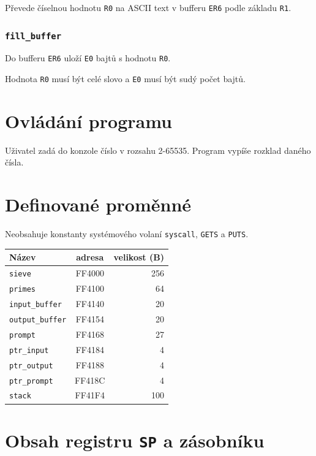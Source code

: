 \documentclass[12pt]{article}
\newcommand{\code}[1]{\mbox{\texttt{#1}}}
\begin{document}
Převede číselnou hodnotu \code{R0} na ASCII text v bufferu \code{ER6} podle
základu \code{R1}.

\subsubsection{\code{fill\_buffer}}

Do bufferu \code{ER6} uloží \code{E0} bajtů s hodnotu \code{R0}.

Hodnota \code{R0} musí být celé slovo a \code{E0} musí být sudý počet bajtů.

\section{Ovládání programu}

Uživatel zadá do konzole číslo v rozsahu 2-65535. Program vypíše rozklad daného
čísla.

\section{Definované proměnné}

Neobsahuje konstanty systémového volaní \code{syscall}, \code{GETS} a
\code{PUTS}.

\begin{table}[H]
	\centering
	\begin{tabular}{|l|c|r|}
		\hline
		Název                 & adresa & velikost (B) \\ \hline
		\code{sieve}          & FF4000 & 256          \\ \hline
		\code{primes}         & FF4100 & 64           \\ \hline
		\code{input\_buffer}  & FF4140 & 20           \\ \hline
		\code{output\_buffer} & FF4154 & 20           \\ \hline
		\code{prompt}         & FF4168 & 27           \\ \hline
		\code{ptr\_input}     & FF4184 & 4            \\ \hline
		\code{ptr\_output}    & FF4188 & 4            \\ \hline
		\code{ptr\_prompt}    & FF418C & 4            \\ \hline
		\code{stack}          & FF41F4 & 100          \\ \hline
	\end{tabular}
\end{table}

\section{Obsah registru \code{SP} a zásobníku}
\end{document}
